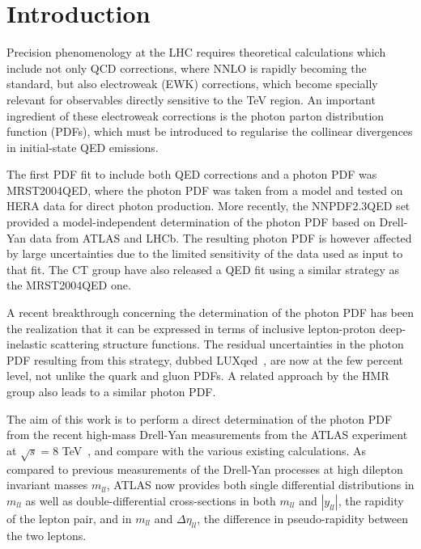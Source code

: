 \section{Introduction}

Precision phenomenology at the LHC requires theoretical calculations which
include not only QCD corrections, where NNLO is rapidly becoming
the standard, but also electroweak (EWK) corrections, which become
specially relevant for observables directly sensitive to the TeV region.
%
An important ingredient of these electroweak corrections is
the photon parton distribution function (PDFs), which must
be introduced
to regularise the collinear divergences in initial-state QED emissions.

The first PDF fit to include both QED corrections and a photon PDF
was MRST2004QED, where the photon PDF was taken from a model
and tested on HERA data for direct photon production.
%
More recently, the NNPDF2.3QED set provided a model-independent
determination of the photon PDF based on Drell-Yan data
from ATLAS and LHCb.
%
The resulting photon PDF is however affected by large uncertainties
due to the limited sensitivity of the data used as input to that
fit.
%
The CT group have also released a QED fit using a similar strategy
as the MRST2004QED one.

A recent breakthrough concerning the determination of the
photon PDF has been the realization that it can be expressed
in terms of inclusive lepton-proton deep-inelastic scattering
structure functions.
%
The residual uncertainties in the photon PDF resulting from
this strategy, dubbed LUXqed~\cite{Manohar:2016nzj}, are now at the few percent level,
not unlike the quark and gluon PDFs.
%
A related approach by the HMR group also leads to a similar
photon PDF.

The aim of this work is to perform a direct determination
of the photon PDF from the recent high-mass Drell-Yan measurements
from the ATLAS experiment at $\sqrt{s}=8$ TeV~\cite{Aad:2016zzw},
and compare
with the various existing calculations.
%
As compared to previous measurements of the Drell-Yan processes
at high dilepton invariant masses $m_{ll}$, ATLAS now provides
both single differential distributions in $m_{ll}$ as well
as double-differential cross-sections in both $m_{ll}$
and $|y_{ll}|$, the rapidity of the lepton pair,
and in  $m_{ll}$ and $\Delta\eta_{ll}$, the difference in pseudo-rapidity
between the two leptons.

